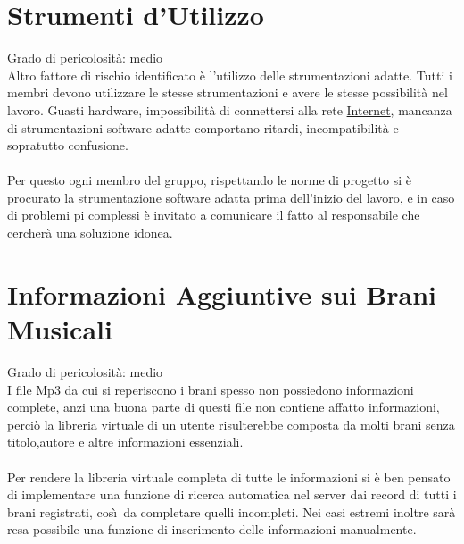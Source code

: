 \section{Strumenti d'Utilizzo}
Grado di pericolosit\`a: medio\\
Altro fattore di rischio identificato \`e l'utilizzo delle strumentazioni adatte. 
Tutti i membri devono utilizzare le stesse strumentazioni e avere le stesse possibilit\`a nel lavoro. 
Guasti hardware, impossibilit\`a di connettersi alla rete \underline{Internet},
mancanza di strumentazioni software adatte comportano ritardi, incompatibilit\`a e sopratutto confusione. \\
\\
Per questo ogni membro del gruppo, 
rispettando le norme di progetto si \`e procurato la strumentazione software adatta prima dell'inizio del 
lavoro, e in caso di problemi pi complessi \`e invitato a comunicare il fatto al responsabile che cercher\`a una soluzione idonea.

\section{Informazioni Aggiuntive sui Brani Musicali}
Grado di pericolosit\`a: medio\\
I file Mp3 da cui si reperiscono i brani spesso non possiedono informazioni
complete, anzi una buona parte di questi file non contiene affatto informazioni, perci\`o la libreria virtuale 
di un utente risulterebbe composta da molti brani senza titolo,autore e altre
informazioni essenziali.\\
\\
Per rendere la libreria virtuale completa di tutte le informazioni si \`e ben pensato di implementare una 
funzione di ricerca automatica nel server dai record di tutti i brani registrati, cos\`\i\ da completare 
quelli incompleti. Nei casi estremi inoltre sar\`a resa possibile una funzione di inserimento delle informazioni manualmente.




